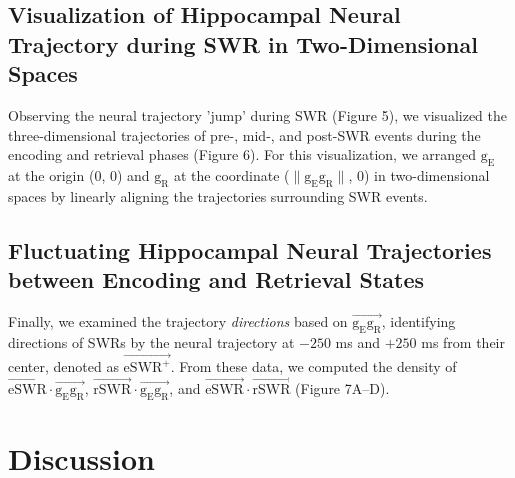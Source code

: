 \documentclass[final,3p,times,twocolumn]{elsarticle}
\begin{document}
\subsection{Visualization of Hippocampal Neural Trajectory during SWR in Two-Dimensional Spaces}
Observing the neural trajectory 'jump' during SWR (Figure 5), we visualized the three-dimensional trajectories of pre-, mid-, and post-SWR events during the encoding and retrieval phases (Figure 6). For this visualization, we arranged $\mathrm{g_{E}}$ at the origin (0, 0) and $\mathrm{g_{R}}$ at the coordinate ($\mathrm{\lVert g_{E}g_{R} \rVert}$, 0) in two-dimensional spaces by linearly aligning the trajectories surrounding SWR events. 

\subsection{Fluctuating Hippocampal Neural Trajectories between Encoding and Retrieval States}
Finally, we examined the trajectory \textit{directions} based on $\overrightarrow{\mathrm{g_{E}g_{R}}}$, identifying directions of SWRs by the neural trajectory at $-250$ ms and $+250$ ms from their center, denoted as $\overrightarrow{\mathrm{eSWR^+}}$. From these data, we computed the density of $\overrightarrow{\mathrm{eSWR}} \cdot \overrightarrow{\mathrm{g_{E}g_{R}}}$, $\overrightarrow{\mathrm{rSWR}} \cdot \overrightarrow{\mathrm{g_{E}g_{R}}}$, and $\overrightarrow{\mathrm{eSWR}} \cdot \overrightarrow{\mathrm{rSWR}}$ (Figure 7A--D).\section{Discussion}
\end{document}

